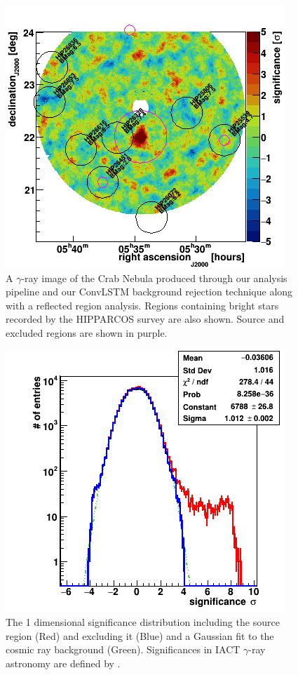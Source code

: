 \begin{figure}[] 
        \centering \includegraphics[width=\columnwidth]{figures/skysig.png}

        \caption{
                \label{fig:skysig} A $\gamma$-ray image of the Crab Nebula produced through our analysis pipeline and our ConvLSTM background rejection technique along with a reflected region analysis. Regions containing bright stars recorded by the HIPPARCOS survey are also shown. Source and excluded regions are shown in purple.
        }
\end{figure}
\begin{figure}[] 
        \centering \includegraphics[width=0.5\columnwidth]{figures/sig1d.png}

        \caption{
                \label{fig:sig1D} The 1 dimensional significance distribution including the source region (Red) and excluding it (Blue) and a Gaussian fit to the cosmic ray background (Green). Significances in IACT $\gamma$-ray astronomy are defined by \cite{LiMa}.
        }
\end{figure}
